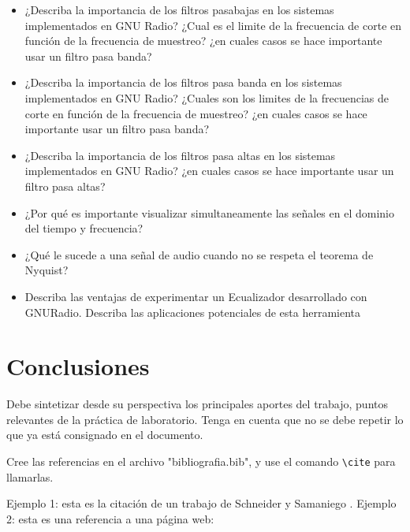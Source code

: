 \documentclass{journal}[IEEEtran, twocolumn]             %
\begin{document}
\begin{multicols}{2}
\begin{itemize}
    \item ¿Describa la importancia de los filtros pasabajas en los sistemas implementados en GNU Radio? ¿Cual es el limite de la frecuencia de corte en función de la frecuencia de muestreo?  ¿en cuales casos se hace importante usar un filtro pasa banda?
    \item ¿Describa la importancia de los filtros pasa banda en los sistemas implementados en GNU Radio? ¿Cuales son los limites de la frecuencias de corte en función de la frecuencia de muestreo? ¿en cuales casos se hace importante usar un filtro pasa banda?
    \item ¿Describa la importancia de los filtros pasa altas en los sistemas implementados en GNU Radio? ¿en cuales casos se hace importante usar un filtro pasa altas?
    
    \item ¿Por qué es importante visualizar simultaneamente las señales en el dominio del tiempo y frecuencia?
    \item ¿Qué le sucede a una señal de audio cuando no se respeta el teorema de Nyquist?
    \item Describa las ventajas de experimentar un Ecualizador desarrollado con GNURadio. Describa las aplicaciones potenciales de esta herramienta
\end{itemize}

\section{Conclusiones}
Debe sintetizar desde su perspectiva los principales aportes del trabajo, puntos relevantes de la práctica de laboratorio. Tenga en cuenta que no se debe repetir lo que ya está consignado en el documento.

Cree las referencias en el archivo "bibliografia.bib", y use el comando \texttt{\textbackslash cite} para llamarlas.

Ejemplo 1: esta es la citación de un trabajo de Schneider y Samaniego \cite{articulo1}.
Ejemplo 2: esta es una referencia a una página web: \cite{referencia2} 




\end{multicols}
\end{document}
